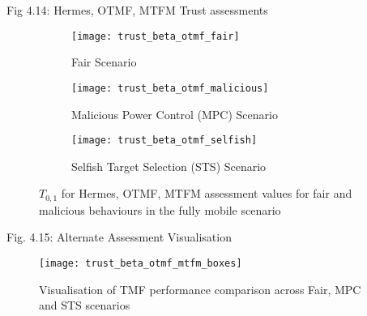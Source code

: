 \documentclass[aspectratio=43]{beamer}
\begin{document}
\begin{frame}{Fig 4.14: Hermes, OTMF, MTFM Trust assessments}
	\begin{figure}[t]
		\centering

			\begin{subfigure}{0.3\textwidth}	
				\texttt{[image: trust\_beta\_otmf\_fair]}
				\caption{Fair Scenario}
				\label{fig:all_mobile_fair_beta}
			\end{subfigure}
			\begin{subfigure}{0.3\textwidth}
				\texttt{[image: trust\_beta\_otmf\_malicious]} 
				\caption{Malicious Power Control (MPC) Scenario}
				\label{fig:all_mobile_badmouthing_beta}
			\end{subfigure} 
			\begin{subfigure}{0.3\textwidth}	
				\texttt{[image: trust\_beta\_otmf\_selfish]} 
				\caption{Selfish Target Selection (STS) Scenario}
				\label{fig:all_mobile_selfish_beta}
			\end{subfigure}

		\caption{$T_{0,1}$ for Hermes, OTMF, MTFM assessment values for fair and malicious behaviours in the fully mobile scenario}
		\label{fig:otmf_beta_comparison}
	\end{figure}
\end{frame}
\begin{frame}{Fig. 4.15: Alternate Assessment Visualisation}
	\begin{figure}
		\centering
		\texttt{[image: trust\_beta\_otmf\_mtfm\_boxes]}
		\caption{Visualisation of TMF performance comparison across Fair, MPC and STS scenarios}
		\label{fig:otmf_beta_comparison_boxes}
	\end{figure}
\end{frame}
\end{document}
